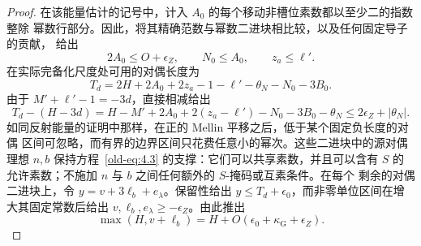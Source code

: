 \begin{proof}
在该能量估计的记号中，计入 $A_0$ 的每个移动非槽位素数都以至少二的指数整除
幂数行部分。因此，将其精确范数与幂数二进块相比较，以及任何固定导子的贡献，
给出
\[
 2A_0\le O+\epsilon_Z,\qquad N_0\le A_0,\qquad z_a\le\ell'.
\]
在实际完备化尺度处可用的对偶长度为
\[
 T_d=2H+2A_0+2z_a-1-\ell'-\theta_N-N_0-3B_0.
\]
由于 $M'+\ell'-1=-3d$，直接相减给出
\[
 T_d-(H-3d)
 =H-M'+2A_0+2(z_a-\ell')-N_0-3B_0-\theta_N
 \le 2\epsilon_Z+|\theta_N|.
\]
如同反射能量的证明中那样，在正的 Mellin 平移之后，低于某个固定负长度的对偶
区间可忽略，而有界的边界区间只花费任意小的幂次。这些二进块中的源对偶理想
$n,b$ 保持方程~\eqref{old-eq:4.3} 的支撑：它们可以共享素数，并且可以含有
$S$ 的允许素数；不施加 $n$ 与 $b$ 之间任何额外的 $S$-掩码或互素条件。在每个
剩余的对偶二进块上，令 $y=v+3\ell_b+e_\lambda$。保留性给出
$y\le T_d+\epsilon_0$，而非零单位区间在增大其固定常数后给出
$v,\ell_b,e_\lambda\ge-\epsilon_Z$。由此推出
\[
 \max(H,v+\ell_b)=H+O(\epsilon_0+\kappa_{\mathrm G}+\epsilon_Z).
\]


\end{proof}
